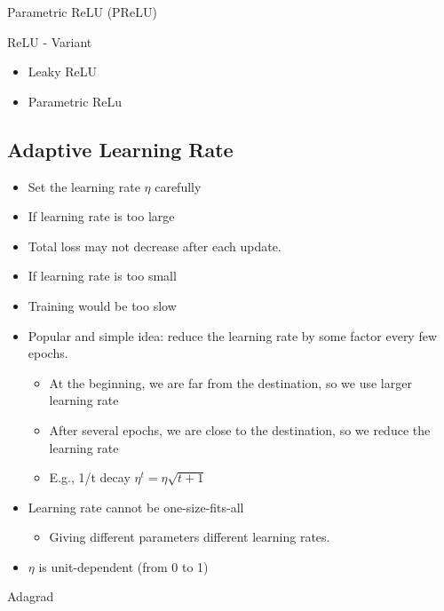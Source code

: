 \documentclass[
]{book}
\providecommand{\tightlist}{%
  \setlength{\itemsep}{0pt}\setlength{\parskip}{0pt}}
\begin{document}
Parametric ReLU (PReLU) \citep{Glorot_2011}

ReLU - Variant

\begin{itemize}
\tightlist
\item
  Leaky ReLU\\
\item
  Parametric ReLu
\end{itemize}

\hypertarget{adaptive-learning-rate}{%
\subsection{Adaptive Learning Rate}\label{adaptive-learning-rate}}

\begin{itemize}
\item
  Set the learning rate \(\eta\) carefully
\item
  If learning rate is too large
\item
  Total loss may not decrease after each update.
\item
  If learning rate is too small
\item
  Training would be too slow
\item
  Popular and simple idea: reduce the learning rate by some factor every few epochs.

  \begin{itemize}
  \tightlist
  \item
    At the beginning, we are far from the destination, so we use larger learning rate
  \item
    After several epochs, we are close to the destination, so we reduce the learning rate
  \item
    E.g., 1/t decay \(\eta^t = \eta \sqrt{t+1}\)
  \end{itemize}
\item
  Learning rate cannot be one-size-fits-all

  \begin{itemize}
  \tightlist
  \item
    Giving different parameters different learning rates.
  \end{itemize}
\item
  \(\eta\) is unit-dependent (from 0 to 1)
\end{itemize}

Adagrad
\end{document}

